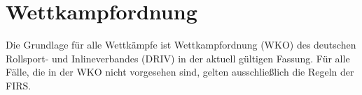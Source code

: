 \section{Wettkampfordnung}
Die Grundlage für alle Wettkämpfe ist Wettkampfordnung (WKO) des deutschen Rollsport- und Inlineverbandes (DRIV) in der aktuell gültigen Fassung. Für alle Fälle, die in der WKO nicht vorgesehen sind, gelten ausschließlich die Regeln der FIRS.